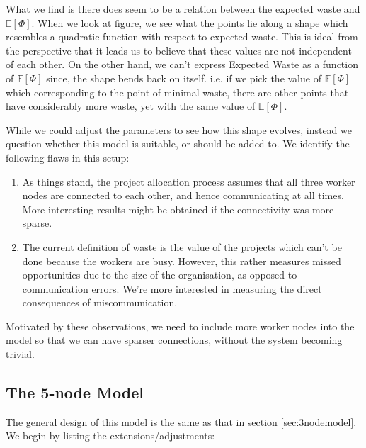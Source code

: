 What we find is there does seem to be a relation between the expected waste and $\mathbb{E}[\Phi]$. When we look at figure, we see what the points lie along a shape which resembles a quadratic function with respect to expected waste. This is ideal from the perspective that it leads us to believe that these values are not independent of each other. On the other hand, we can't express Expected Waste as a function of $\mathbb{E}[\Phi]$ since, the shape bends back on itself. i.e. if we pick the value of $\mathbb{E}[\Phi]$ which corresponding to the point of minimal waste, there are other points that have considerably more waste, yet with the same value of $\mathbb{E}[\Phi]$.

While we could adjust the parameters to see how this shape evolves, instead we question whether this model is suitable, or should be added to. We identify the following flaws in this setup:

\begin{enumerate}
	\item As things stand, the project allocation process assumes that all three worker nodes are connected to each other, and hence communicating at all times. More interesting results might be obtained if the connectivity was more sparse.
	
	\item The current definition of waste is the value of the projects which can't be done because the workers are busy. However, this rather measures missed opportunities due to the size of the organisation, as opposed to communication errors. We're more interested in measuring the direct consequences of miscommunication.

\end{enumerate}

Motivated by these observations, we need to include more worker nodes into the model so that we can have sparser connections, without the system becoming trivial. 

\subsection{The 5-node Model}

The general design of this model is the same as that in section \ref{sec:3nodemodel}. We begin by listing the extensions/adjustments:



